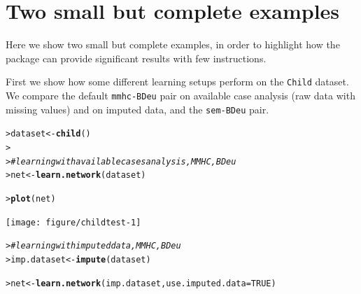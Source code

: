 \documentclass{article}\usepackage[]{graphicx}\usepackage[]{color}
\makeatletter
\newcommand{\hlnum}[1]{\textcolor[rgb]{0.686,0.059,0.569}{#1}}%
\newcommand{\hlcom}[1]{\textcolor[rgb]{0.678,0.584,0.686}{\textit{#1}}}%
\newcommand{\hlstd}[1]{\textcolor[rgb]{0.345,0.345,0.345}{#1}}%
\newcommand{\hlkwb}[1]{\textcolor[rgb]{0.69,0.353,0.396}{#1}}%
\newcommand{\hlkwc}[1]{\textcolor[rgb]{0.333,0.667,0.333}{#1}}%
\newcommand{\hlkwd}[1]{\textcolor[rgb]{0.737,0.353,0.396}{\textbf{#1}}}%
\newenvironment{kframe}{%
 \def\at@end@of@kframe{}%
 \ifinner\ifhmode%
  \def\at@end@of@kframe{\end{minipage}}%
  \begin{minipage}{\columnwidth}%
 \fi\fi%
 \def\FrameCommand##1{\hskip\@totalleftmargin \hskip-\fboxsep
 \colorbox{shadecolor}{##1}\hskip-\fboxsep
     \hskip-\linewidth \hskip-\@totalleftmargin \hskip\columnwidth}%
 \MakeFramed {\advance\hsize-\width
   \@totalleftmargin\z@ \linewidth\hsize
   \@setminipage}}%
 {\par\unskip\endMakeFramed%
 \at@end@of@kframe}
\newenvironment{knitrout}{}{} %
\makeatother
\begin{document}
\section{Two small but complete examples}
Here we show two small but complete examples, in order to highlight how the package can provide significant results
with few instructions.

First we show how some different learning setups perform on the \texttt{Child} dataset. We compare the default
\texttt{mmhc-BDeu} pair on available case analysis (raw data with missing values) and on imputed data, and
the \texttt{sem-BDeu} pair.

\begin{knitrout}
\color{fgcolor}\begin{kframe}
\begin{alltt}
\hlstd{> }\hlstd{dataset} \hlkwb{<-} \hlkwd{child}\hlstd{()}
\hlstd{> }
\hlstd{> }\hlcom{# learning with available cases analysis, MMHC, BDeu}
\hlstd{> }\hlstd{net} \hlkwb{<-} \hlkwd{learn.network}\hlstd{(dataset)}
\end{alltt}


{\ttfamily\noindent\itshape\color{messagecolor}{bnstruct :: learning the structure using MMHC ...\\bnstruct :: learning using MMHC completed.\\bnstruct :: learning network parameters ... \\bnstruct :: parameter learning done.}}\begin{alltt}
\hlstd{> }\hlkwd{plot}\hlstd{(net)}
\end{alltt}
\end{kframe}
\texttt{[image: figure/childtest-1]} 
\begin{kframe}\begin{alltt}
\hlstd{> }\hlcom{# learning with imputed data, MMHC, BDeu}
\hlstd{> }\hlstd{imp.dataset} \hlkwb{<-} \hlkwd{impute}\hlstd{(dataset)}
\end{alltt}


{\ttfamily\noindent\itshape\color{messagecolor}{bnstruct :: performing imputation ...\\bnstruct :: imputation finished.}}\begin{alltt}
\hlstd{> }\hlstd{net} \hlkwb{<-} \hlkwd{learn.network}\hlstd{(imp.dataset,} \hlkwc{use.imputed.data} \hlstd{=} \hlnum{TRUE}\hlstd{)}
\end{alltt}



\end{kframe}
\end{knitrout}
\end{document}
